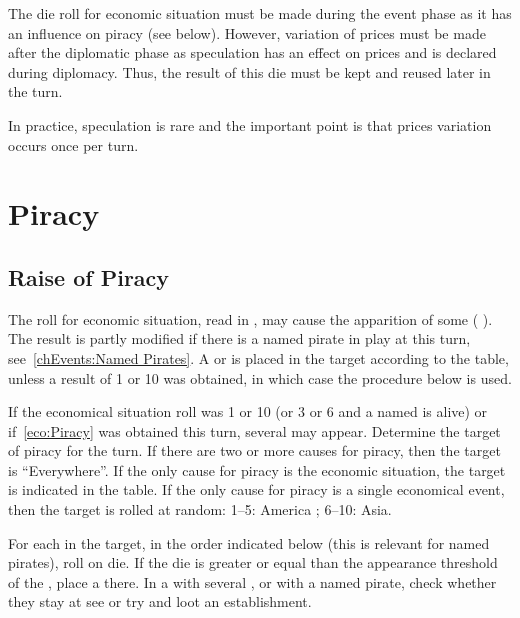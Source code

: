 \begin{designnote}
  The die roll for economic situation must be made during the event
  phase as it has an influence on piracy (see below). However, variation
  of prices must be made after the diplomatic phase as speculation has
  an effect on prices and is declared during diplomacy. Thus, the result
  of this die must be kept and reused later in the turn.

  In practice, speculation is rare and the important point is that
  prices variation occurs once per turn.
\end{designnote}


\section{Piracy}\label{chEvents:Piracy}


\subsection{Raise of Piracy}

\aparag The roll for economic situation, read in , may cause the apparition of some \PIRATE
( \corsaire). The result is partly modified if there is a
named pirate in play at this turn, see~\ref{chEvents:Named Pirates}.
\bparag A \PIRATE \corsaire\facemoins or \PIRATE \corsaire\faceplus is
placed in the target \STZ according to the table, unless a result of 1
or 10 was obtained, in which case the procedure below is used.

\aparag If the economical situation roll was 1 or 10 (or 3 or 6 and a
named  \LeaderA is alive) or if~\ref{eco:Piracy} was
obtained this turn, several \PIRATE may appear. Determine the target of
piracy for the turn.
\bparag If there are two or more causes for piracy, then the target is
``Everywhere''.
\bparag If the only cause for piracy is the economic situation, the
target is indicated in the table.
\bparag If the only cause for piracy is a single economical event, then
the target is rolled at random: 1--5: America ; 6--10: Asia.

\aparag For each \STZ in the target, in the order indicated below (this
is relevant for named pirates), roll on die. If the die is greater or
equal than the appearance threshold of the \STZ, place a
\PIRATE\facemoins there.
\bparag In a \STZ with several \PIRATE\faceplus, or with a named pirate,
check whether they stay at see or try and loot an establishment.

